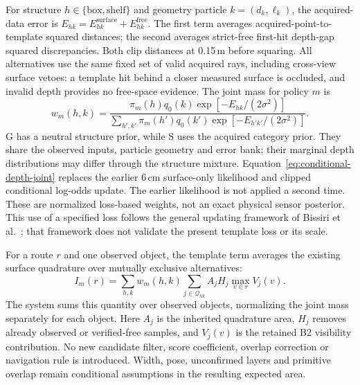 For structure $h\in\{\mathrm{box},\mathrm{shelf}\}$ and geometry particle
$k=(d_k,\ell_k)$, the acquired-data error is
$E_{hk}=E^{\mathrm{surface}}_{hk}+E^{\mathrm{free}}_{hk}$.
The first term averages acquired-point-to-template squared distances; the
second averages strict-free first-hit depth-gap squared discrepancies. Both
clip distances at 0.15\,m before squaring. All alternatives use the same
fixed set of valid acquired rays, including cross-view surface vetoes: a
template hit behind a closer measured surface is occluded, and invalid depth
provides no free-space evidence. The joint mass for policy $m$ is
\begin{equation}
 w_m(h,k)=
 \frac{\pi_m(h)q_0(k)\exp[-E_{hk}/(2\sigma^2)]}
 {\sum_{h',k'}\pi_m(h')q_0(k')\exp[-E_{h'k'}/(2\sigma^2)]}.
 \label{eq:conditional-depth-joint}
\end{equation}
G has a neutral structure prior, while S uses the acquired category prior.
They share the observed inputs, particle geometry and error bank; their
marginal depth distributions may differ through the structure mixture.
Equation~\eqref{eq:conditional-depth-joint} replaces the earlier 6\,cm
surface-only likelihood and clipped conditional log-odds update. The earlier
likelihood is not applied a second time. These are normalized loss-based
weights, not an exact physical sensor posterior. This use of a specified loss
follows the general updating framework of Bissiri et al.~\cite{bissiri2016};
that framework does not validate the present template loss or its scale.

For a route $r$ and one observed object, the template term averages the
existing surface quadrature over mutually exclusive alternatives:
\begin{equation}
 I_m(r)=\sum_{h,k}w_m(h,k)
       \sum_{j\in\mathcal{Q}_{hk}} A_j H_j
       \max_{v\in r}V_j(v).
\end{equation}
The system sums this quantity over observed objects, normalizing the joint
mass separately for each object. Here $A_j$ is the inherited quadrature area,
$H_j$ removes already observed or verified-free samples, and $V_j(v)$ is the
retained B2 visibility contribution.
No new candidate filter, score coefficient, overlap correction or navigation
rule is introduced. Width, pose, unconfirmed layers and primitive overlap
remain conditional assumptions in the resulting expected area.

